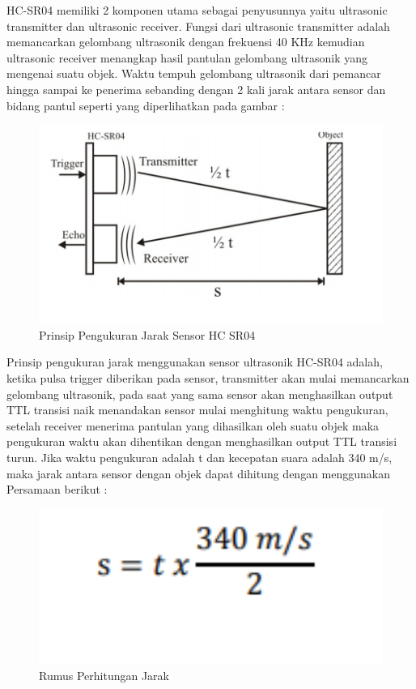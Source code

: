 \begin{enumerate}
\par HC-SR04 memiliki 2 komponen utama sebagai penyusunnya yaitu ultrasonic transmitter dan ultrasonic receiver. Fungsi dari ultrasonic transmitter adalah memancarkan gelombang ultrasonik dengan frekuensi 40 KHz kemudian ultrasonic receiver menangkap hasil pantulan gelombang ultrasonik yang mengenai suatu objek. Waktu tempuh gelombang ultrasonik dari pemancar hingga sampai ke penerima sebanding dengan 2 kali jarak antara sensor dan bidang
pantul seperti yang diperlihatkan pada gambar :
\begin{figure}[H]
\centering
\includegraphics[width=1\textwidth]{figures/sr04.png}
\caption{Prinsip Pengukuran Jarak Sensor HC SR04}
\label{print}
\end{figure}
\par Prinsip pengukuran jarak menggunakan sensor ultrasonik HC-SR04 adalah, ketika pulsa trigger diberikan pada sensor, transmitter akan mulai memancarkan gelombang ultrasonik, pada saat yang sama sensor akan menghasilkan output TTL transisi naik menandakan sensor mulai menghitung waktu pengukuran, setelah receiver menerima pantulan yang dihasilkan oleh suatu objek maka pengukuran waktu akan dihentikan dengan menghasilkan output TTL transisi turun. Jika waktu pengukuran adalah t dan kecepatan suara adalah 340 m/s, maka jarak antara sensor dengan objek dapat dihitung dengan menggunakan Persamaan berikut :
\begin{figure}[H]
\centering
\includegraphics[width=1\textwidth]{figures/rumus2.png}
\caption{Rumus Perhitungan Jarak}
\label{print}
\end{figure}


\end{enumerate}

